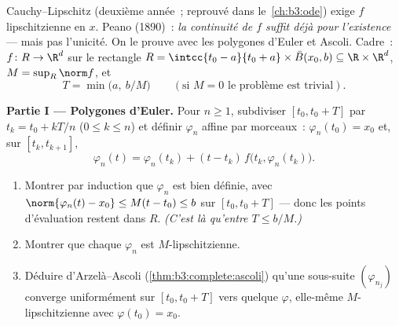 \begin{problem}[{Problème de fin de semaine --- existence de
solutions de $x' = f(t, x)$ sans Lipschitz}]\label{pb:b3:complete:1}
Cauchy--Lipschitz (deuxième année~; reprouvé dans
le~\cref{ch:b3:ode}) exige $f$ lipschitzienne en $x$. Peano
(1890)~: \emph{la continuité de $f$ suffit déjà pour
l'existence} --- mais pas l'unicité. On le prouve avec les
polygones d'Euler et Ascoli. Cadre~: $f \colon R \to \R^d$
 sur le rectangle $R = \intcc{t_0 - a}{t_0 + a}\times
\bar B(x_0, b) \subseteq \R\times\R^d$, $M = \sup_R\norm f$,
et
\[
T = \min\bigl(a,\ b/M\bigr)
\qquad (\text{si } M = 0 \text{ le problème est trivial}).
\]

\medskip
\noindent\textbf{Partie I --- Polygones d'Euler.} Pour $n \geq
1$, subdiviser $[t_0, t_0 + T]$ par $t_k = t_0 + kT/n$ ($0
\leq k \leq n$) et définir $\varphi_n$ affine par morceaux~:
$\varphi_n(t_0) = x_0$ et, sur $[t_k, t_{k+1}]$,
\[
\varphi_n(t) = \varphi_n(t_k) + (t -
t_k)\,f\bigl(t_k, \varphi_n(t_k)\bigr).
\]
\begin{enumerate}
  \item Montrer par induction que $\varphi_n$ est bien définie,
        avec $\norm{\varphi_n(t) - x_0} \leq M(t - t_0) \leq b$
        sur $[t_0, t_0 + T]$ --- donc les points d'évaluation
        restent dans $R$. \emph{(C'est là qu'entre $T \leq
        b/M$.)}
  \item Montrer que chaque $\varphi_n$ est $M$-lipschitzienne.
  \item Déduire d'Arzelà--Ascoli
        (\cref{thm:b3:complete:ascoli}) qu'une sous-suite
        $(\varphi_{n_j})$ converge uniformément sur $[t_0, t_0
        + T]$ vers quelque $\varphi$, elle-même
        $M$-lipschitzienne avec $\varphi(t_0) = x_0$.
\end{enumerate}


\end{problem}
